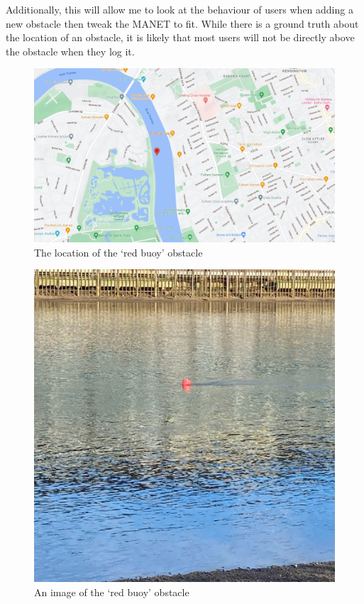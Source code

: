 \documentclass[10pt, a4paper]{article}
\begin{document}
Additionally, this will allow me to look at the behaviour of users when adding a new obstacle then tweak the MANET to fit. While there is a ground truth about the location of an obstacle, it is likely that most users will not be directly above the obstacle when they log it. 

\begin{figure}[h]
\caption{The location of the `red buoy' obstacle \cite{maps}}
\begin{center}
\includegraphics[scale=0.3]{buoy.jpg}
\end{center}
\end{figure}

\begin{figure}[h]
\caption{An image of the `red buoy' obstacle \cite{myphoto}}
\begin{center}
\includegraphics[scale=0.1]{buoy2.jpg}
\end{center}
\end{figure}
\FloatBarrier
\end{document}
